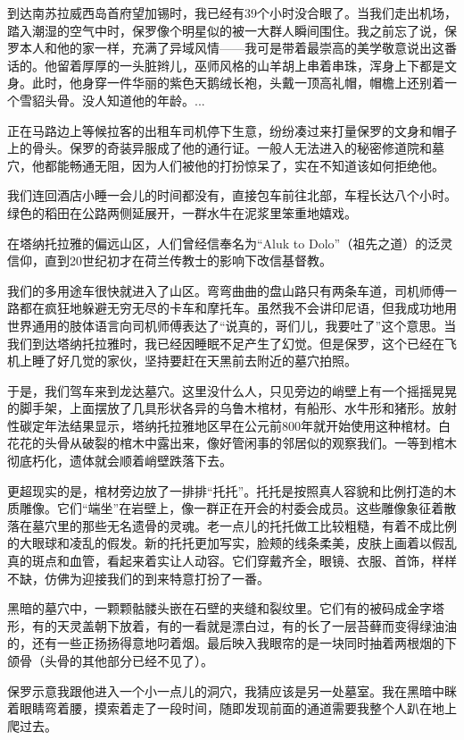\documentclass[12pt,oneside]{book}
\begin{document}
\begin{bookref}[frametitle={\cite{好好告别：世界葬礼观察手记}}]
到达南苏拉威西岛首府望加锡时，我已经有39个小时没合眼了。当我们走出机场，踏入潮湿的空气中时，保罗像个明星似的被一大群人瞬间围住。我之前忘了说，保罗本人和他的家一样，充满了异域风情——我可是带着最崇高的美学敬意说出这番话的。他留着厚厚的一头脏辫儿，巫师风格的山羊胡上串着串珠，浑身上下都是文身。此时，他身穿一件华丽的紫色天鹅绒长袍，头戴一顶高礼帽，帽檐上还别着一个雪貂头骨。没人知道他的年龄。...

正在马路边上等候拉客的出租车司机停下生意，纷纷凑过来打量保罗的文身和帽子上的骨头。保罗的奇装异服成了他的通行证。一般人无法进入的秘密修道院和墓穴，他都能畅通无阻，因为人们被他的打扮惊呆了，实在不知道该如何拒绝他。

我们连回酒店小睡一会儿的时间都没有，直接包车前往北部，车程长达八个小时。绿色的稻田在公路两侧延展开，一群水牛在泥浆里笨重地嬉戏。

在塔纳托拉雅的偏远山区，人们曾经信奉名为“Aluk to Dolo”（祖先之道）的泛灵信仰，直到20世纪初才在荷兰传教士的影响下改信基督教。

我们的多用途车很快就进入了山区。弯弯曲曲的盘山路只有两条车道，司机师傅一路都在疯狂地躲避无穷无尽的卡车和摩托车。虽然我不会讲印尼语，但我成功地用世界通用的肢体语言向司机师傅表达了“说真的，哥们儿，我要吐了”这个意思。当我们到达塔纳托拉雅时，我已经因睡眠不足产生了幻觉。但是保罗，这个已经在飞机上睡了好几觉的家伙，坚持要赶在天黑前去附近的墓穴拍照。

于是，我们驾车来到龙达墓穴。这里没什么人，只见旁边的峭壁上有一个摇摇晃晃的脚手架，上面摆放了几具形状各异的乌鲁木棺材，有船形、水牛形和猪形。放射性碳定年法结果显示，塔纳托拉雅地区早在公元前800年就开始使用这种棺材。白花花的头骨从破裂的棺木中露出来，像好管闲事的邻居似的观察我们。一等到棺木彻底朽化，遗体就会顺着峭壁跌落下去。

更超现实的是，棺材旁边放了一排排“托托”。托托是按照真人容貌和比例打造的木质雕像。它们“端坐”在岩壁上，像一群正在开会的村委会成员。这些雕像象征着散落在墓穴里的那些无名遗骨的灵魂。老一点儿的托托做工比较粗糙，有着不成比例的大眼球和凌乱的假发。新的托托更加写实，脸颊的线条柔美，皮肤上画着以假乱真的斑点和血管，看起来着实让人动容。它们穿戴齐全，眼镜、衣服、首饰，样样不缺，仿佛为迎接我们的到来特意打扮了一番。

黑暗的墓穴中，一颗颗骷髅头嵌在石壁的夹缝和裂纹里。它们有的被码成金字塔形，有的天灵盖朝下放着，有的一看就是漂白过，有的长了一层苔藓而变得绿油油的，还有一些正扬扬得意地叼着烟。最后映入我眼帘的是一块同时抽着两根烟的下颌骨（头骨的其他部分已经不见了）。

保罗示意我跟他进入一个小一点儿的洞穴，我猜应该是另一处墓室。我在黑暗中眯着眼睛弯着腰，摸索着走了一段时间，随即发现前面的通道需要我整个人趴在地上爬过去。


\end{bookref}
\end{document}
